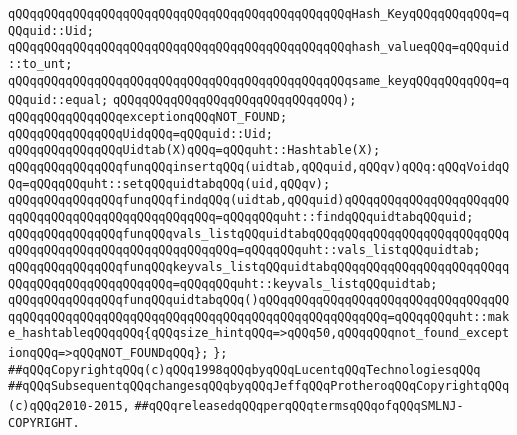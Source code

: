 \verb|qQQqqQQqqQQqqQQqqQQqqQQqqQQqqQQqqQQqqQQqqQQqqQQqHash_KeyqQQqqQQqqQQq=qQQquid::Uid;|\newline
\verb|qQQqqQQqqQQqqQQqqQQqqQQqqQQqqQQqqQQqqQQqqQQqqQQqhash_valueqQQq=qQQquid::to_unt;|\newline
\verb|qQQqqQQqqQQqqQQqqQQqqQQqqQQqqQQqqQQqqQQqqQQqqQQqsame_keyqQQqqQQqqQQq=qQQquid::equal;|\newline
\verb|qQQqqQQqqQQqqQQqqQQqqQQqqQQqqQQq);|\newline
\newline
\verb|qQQqqQQqqQQqqQQqexceptionqQQqNOT_FOUND;|\newline
\newline
\verb|qQQqqQQqqQQqqQQqUidqQQq=qQQquid::Uid;|\newline
\verb|qQQqqQQqqQQqqQQqUidtab(X)qQQq=qQQquht::Hashtable(X);|\newline
\newline
\verb|qQQqqQQqqQQqqQQqfunqQQqinsertqQQq(uidtab,qQQquid,qQQqv)qQQq:qQQqVoidqQQq=qQQqqQQquht::setqQQquidtabqQQq(uid,qQQqv);|\newline
\verb|qQQqqQQqqQQqqQQqfunqQQqfindqQQq(uidtab,qQQquid)qQQqqQQqqQQqqQQqqQQqqQQqqQQqqQQqqQQqqQQqqQQqqQQqqQQq=qQQqqQQquht::findqQQquidtabqQQquid;|\newline
\newline
\verb|qQQqqQQqqQQqqQQqfunqQQqvals_listqQQquidtabqQQqqQQqqQQqqQQqqQQqqQQqqQQqqQQqqQQqqQQqqQQqqQQqqQQqqQQqqQQq=qQQqqQQquht::vals_listqQQquidtab;|\newline
\verb|qQQqqQQqqQQqqQQqfunqQQqkeyvals_listqQQquidtabqQQqqQQqqQQqqQQqqQQqqQQqqQQqqQQqqQQqqQQqqQQqqQQq=qQQqqQQquht::keyvals_listqQQquidtab;|\newline
\newline
\verb|qQQqqQQqqQQqqQQqfunqQQquidtabqQQq()qQQqqQQqqQQqqQQqqQQqqQQqqQQqqQQqqQQqqQQqqQQqqQQqqQQqqQQqqQQqqQQqqQQqqQQqqQQqqQQqqQQqqQQq=qQQqqQQquht::make_hashtableqQQqqQQq{qQQqsize_hintqQQq=>qQQq50,qQQqqQQqnot_found_exceptionqQQq=>qQQqNOT_FOUNDqQQq};|\newline
\verb|};|\newline
\newline
\newline
\verb|##qQQqCopyrightqQQq(c)qQQq1998qQQqbyqQQqLucentqQQqTechnologiesqQQq|\newline
\verb|##qQQqSubsequentqQQqchangesqQQqbyqQQqJeffqQQqProtheroqQQqCopyrightqQQq(c)qQQq2010-2015,|\newline
\verb|##qQQqreleasedqQQqperqQQqtermsqQQqofqQQqSMLNJ-COPYRIGHT.|\newline

